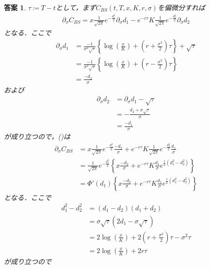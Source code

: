 \documentclass[11pt,a4paper]{jsarticle}
\theoremstyle{mystyle}
\newtheorem*{ans}{答案}
\begin{document}
\begin{ans}
	$\tau \coloneqq T - t$として，まず$C_{BS}(t,T,x,K,r,\sigma)$を偏微分すれば
	\begin{align}
		\partial_{\sigma}C_{BS}
		= x \frac{1}{\sqrt{2\pi}}e^{-\frac{d_{1}^{2}}{2}}\partial_{\sigma}d_{1}
		- e^{-r\tau}K\frac{1}{\sqrt{2\pi}}e^{-\frac{d_{2}^{2}}{2}}\partial_{\sigma}d_{2}
		\label{formula:3_1}
	\end{align}
	となる．ここで
	\begin{align}
		\partial_{\sigma}d_{1} &= \frac{-1}{\sigma^{2}\sqrt{\tau}}
		\left\{\log{\left(\frac{x}{K}\right)}+\left(r+\frac{\sigma^{2}}{2}\right)\tau\right\} + \sqrt{\tau} \\
		&= \frac{-1}{\sigma^{2}\sqrt{\tau}}
		\left\{\log{\left(\frac{x}{K}\right)}+\left(r-\frac{\sigma^{2}}{2}\right)\tau\right\} \\
		&= \frac{-d_{2}}{\sigma}
	\end{align}
	および
	\begin{align}
		\partial_{\sigma}d_{2} &= \partial_{\sigma}d_{1}-\sqrt{\tau} \\
		&= -\frac{d_{2} + \sigma \sqrt{\tau}}{\sigma} \\
		&= \frac{-d_{1}}{\sigma}
	\end{align}
	が成り立つので，()は
	\begin{align}
		\partial_{\sigma}C_{BS} &= x \frac{1}{\sqrt{2\pi}}e^{-\frac{d_{1}^{2}}{2}}
		\frac{-d_{2}}{\sigma} + e^{-r\tau}K\frac{1}{\sqrt{2\pi}}e^{-\frac{d_{2}^{2}}{2}}\frac{d_{1}}{\sigma} \\
		&= \frac{1}{\sqrt{2\pi}}e^{-\frac{d_{1}^{2}}{2}}
		\left\{x\frac{-d_{2}}{\sigma} + e^{-r\tau}K\frac{d_{1}}{\sigma}e^{\frac{1}{2}(d_{1}^{2}-d_{2}^{2})}\right\} \\
		&= \Phi'(d_{1}) \left\{x\frac{-d_{2}}{\sigma} + e^{-r\tau}K\frac{d_{1}}{\sigma}e^{\frac{1}{2}(d_{1}^{2}-d_{2}^{2})}\right\}
		\label{formula:3_2}
	\end{align}
	となる．ここで
	\begin{align}
		d_{1}^{2}-d_{2}^{2}
		&= (d_{1}-d_{2})(d_{1}+d_{2}) \\
		&= \sigma \sqrt{\tau}(2d_{1}-\sigma \sqrt{\tau}) \\
		&= 2\log{\left(\frac{x}{K}\right)} + 2\left(r+\frac{\sigma^{2}}{2}\right)\tau
		- \sigma^{2}\tau \\
		&= 2\log{\left(\frac{x}{K}\right)} + 2r\tau
	\end{align}
	が成り立つので
	\begin{align}

\end{align}
\end{ans}
\end{document}
